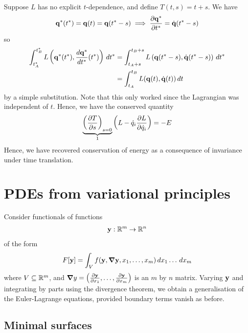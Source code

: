 \documentclass{../template/note}
\begin{document}
    \begin{example*}
        Suppose $L$ has no explicit $t$-dependence, and define $T(t, s) = t+s$. We have
        \begin{align*}
            \V q^*(t^*) = \V q(t) = \V q(t^* - s) \implies \pd{\V q^*}{t^*} = \dot{\V q}(t^*-s)
        \end{align*}
        so
        \begin{align*}
            \int_{t_A^*}^{t_B^*} L\left(\V q^*(t^*), \frac{d \V q^*}{dt^*}(t^*)\right) \D t^* &= \int_{t_A+s}^{t_B+s} L\left(\V q(t^*-s), \dot{\V q}(t^*-s)\right) \D t^* \\
            &= \int_{t_A}^{t_B} L(\V q(t), \dot{\V q}(t)) \D t
        \end{align*}
        by a simple substitution. Note that this only worked since the Lagrangian was independent of $t$. Hence, we have the conserved quantity
        \begin{align*}
            \underbrace{\left(\pd{T}{s}\right)_{s=0}}_1 \left(L - \dot q_i \pd{L}{\dot q_i}\right) = -E
        \end{align*}
        Hence, we have recovered conservation of energy as a consequence of invariance under time translation.      
    \end{example*}

    \section{PDEs from variational principles}

    Consider functionals of functions
    \begin{align*}
        \V y: \RR^m \to \RR^n
    \end{align*}
    of the form
    \begin{align*}
        F[\V y] = \int_V f(\V y, \grad \V y, x_1, \dots, x_m) \D x_1 \dots \D x_m
    \end{align*}
    where $V \subseteq \mathbb R^m$, and $\grad y = \left(\pd{\V y}{x_1}, \dots, \pd{\V y}{x_m}\right)$ is an $m$ by $n$ matrix. Varying $\V y$ and integrating by parts using the divergence theorem, we obtain a generalisation of the Euler-Lagrange equations, provided boundary terms vanish as before.

    \subsection{Minimal surfaces}
\end{document}
